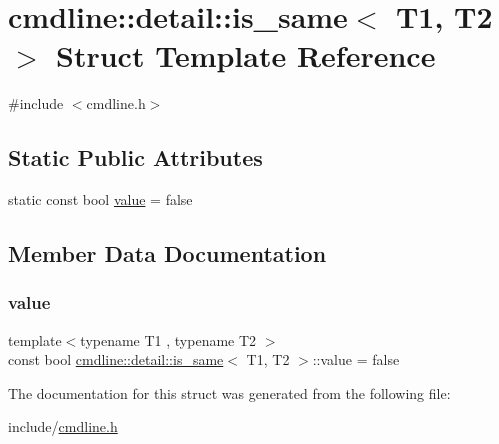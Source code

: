 \hypertarget{structcmdline_1_1detail_1_1is__same}{}\section{cmdline\+::detail\+::is\+\_\+same$<$ T1, T2 $>$ Struct Template Reference}
\label{structcmdline_1_1detail_1_1is__same}


{\ttfamily \#include $<$cmdline.\+h$>$}

\subsection*{Static Public Attributes}
\begin{DoxyCompactItemize}
\item 
static const bool \mbox{\hyperlink{structcmdline_1_1detail_1_1is__same_aee0ed17263370d2446766f79c85c0f43}{value}} = false
\end{DoxyCompactItemize}


\subsection{Member Data Documentation}
\mbox{\label{structcmdline_1_1detail_1_1is__same_aee0ed17263370d2446766f79c85c0f43}} 
\subsubsection{\texorpdfstring{value}{value}}
{\footnotesize\ttfamily template$<$typename T1 , typename T2 $>$ \\
const bool \mbox{\hyperlink{structcmdline_1_1detail_1_1is__same}{cmdline\+::detail\+::is\+\_\+same}}$<$ T1, T2 $>$\+::value = false\hspace{0.3cm}{\ttfamily [static]}}



The documentation for this struct was generated from the following file\+:\begin{DoxyCompactItemize}
\item 
include/\mbox{\hyperlink{cmdline_8h}{cmdline.\+h}}\end{DoxyCompactItemize}
